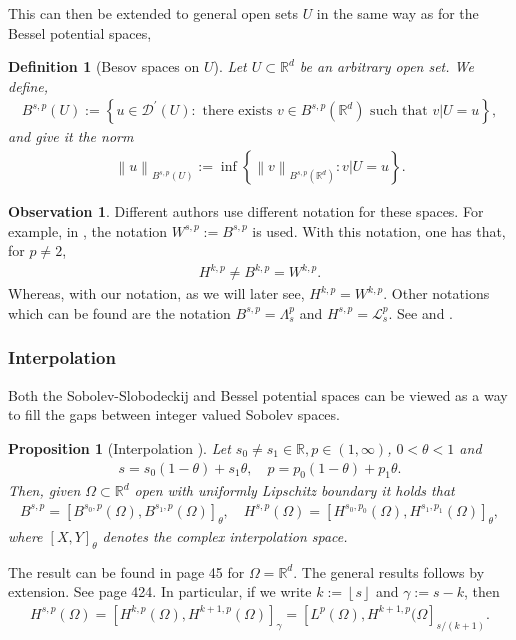 \documentclass[
    a4paper,
    DIV=14,
    abstract=true,
    numbers=noenddot
]
{scrartcl}
\newtheorem{proposition}[theorem]{Proposition}
\newtheorem{definition}[theorem]{Definition}
\theoremstyle{definition}
\newtheorem{observation}{Observation}
\newcommand{\set}[1]{\left\{#1\right\}}
\renewcommand{\norm}[1]{\left\lVert #1 \right\rVert}\renewcommand{\abs}[1]{\left| #1 \right|}
\newcommand\restr[2]{\left.#1\right|{#2}}
\newcommand{\R}{\mathbb{R}}
\newcommand{\Ll}{\mathcal{L}}
\begin{document}
This can then be extended to general open sets $U$ in the same way as for the Bessel potential spaces,
\begin{definition}[Besov spaces on $U$]
    Let $U \subset \R^d$ be an arbitrary open set. We define,
    \begin{align*}
        B^{s,p}(U):=\left\{u \in \mathcal{D}^{\prime}(U): \text{ there exists } v \in B^{s,p}(\R^d) \text{ such that } \restr{v}{U}=u\right\},
    \end{align*}
    and give it the norm
    \begin{align*}
        \norm{u}_{B^{s,p}(U)}:= \inf \set{\norm{v}_{B^{s,p}(\R^d)}: \restr{v}{U}=u}.
    \end{align*}
\end{definition}
\begin{observation}
    Different authors use different notation for these spaces. For example, in \cite{triebel1992theory}, the notation $W^{s,p}:= B^{s,p}$ is used. With this notation, one has that, for $p \neq 2$,
    \begin{align*}
        H^{k,p} \neq B^{k,p}= W^{k,p}.
    \end{align*}
    Whereas, with our notation, as we will later see, $H^{k,p}=W^{k,p}$. Other notations which can be found are  the notation $B^{s,p}= \Lambda^{p}_s$ and $H^{s,p}= \Ll ^{p}_s$. See \cite{stein1970singular} and \cite{biccari2018local}.
\end{observation}
\subsubsection{Interpolation}
Both the Sobolev-Slobodeckij and Bessel potential spaces can be viewed as a way to fill the gaps between integer valued Sobolev spaces.
\begin{proposition}[Interpolation ]\label{interpolation}
    Let $s_0 \neq s_1 \in \R, p \in (1, \infty)$, $0<\theta<1$ and
    \begin{align*}
        s=s_0(1-\theta)+s_1 \theta, \quad p=p_0(1-\theta)+p_1 \theta.
    \end{align*}
    Then, given $\Omega \subset \R^d$ open with uniformly Lipschitz boundary it holds that
    \begin{align*}
        B^{s,p}=\left[B^{s_0,p}(\Omega ), B^{s_1, p}(\Omega )\right]_\theta,\quad H^{s,p}(\Omega )=\left[H^{s_0,p_0}(\Omega), H^{s_1,p_1}(\Omega)\right]_{\theta},
    \end{align*}
    where $[X,Y]_\theta$ denotes the complex interpolation space.
\end{proposition}
The result can be found in \cite{triebel1992theory} page 45 for $\Omega = \R^d$. The general results follows by extension. See \cite{leoni2017first} page 424. In particular, if we write $k:=\left\lfloor s \right\rfloor$ and $\gamma:=s-k$, then
\begin{align*}
    H^{s,p}(\Omega )=\left[H^{k,p}(\Omega), H^{k+1,p}(\Omega)\right]_{\gamma }= \left[L^p(\Omega ), H^{k+1,p}(\Omega\right]_{s/(k+1) }.
\end{align*}
\end{document}
